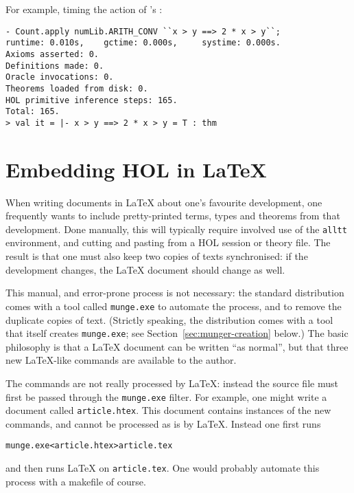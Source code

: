 For example, timing the action of 's :

\setcounter{sessioncount}{1}
\begin{session}
\begin{verbatim}
- Count.apply numLib.ARITH_CONV ``x > y ==> 2 * x > y``;
runtime: 0.010s,    gctime: 0.000s,     systime: 0.000s.
Axioms asserted: 0.
Definitions made: 0.
Oracle invocations: 0.
Theorems loaded from disk: 0.
HOL primitive inference steps: 165.
Total: 165.
> val it = |- x > y ==> 2 * x > y = T : thm
\end{verbatim}
\end{session}



\section{Embedding HOL in \LaTeX{}}

%
When writing documents in \LaTeX{} about one's favourite \HOL{} development, one frequently wants to include pretty-printed terms, types and theorems from that development.
%
Done manually, this will typically require involved use of the \texttt{alltt} environment, and cutting and pasting from a HOL session or theory file.
%
The result is that one must also keep two copies of \HOL{} texts synchronised: if the \HOL{} development changes, the \LaTeX{} document should change as well.

\newcommand{\munge}{\texttt{munge.exe}}
%
This manual, and error-prone process is not necessary: the standard \HOL{} distribution comes with a tool called \munge{} to automate the process, and to remove the duplicate copies of \HOL{} text.
%
(Strictly speaking, the distribution comes with a tool that itself creates \munge{}; see Section~\ref{sec:munger-creation} below.)
%
The basic philosophy is that a \LaTeX{} document can be written ``as normal'', but that three new \LaTeX{}-like commands are available to the author.

The commands are not really processed by \LaTeX{}: instead the source file must first be passed through the \munge{} filter.
%
For example, one might write a document called \texttt{article.htex}.
%
This document contains instances of the new commands, and cannot be processed as is by \LaTeX{}.
%
Instead one first runs
\begin{alltt}
   \munge < article.htex > article.tex
\end{alltt}
and then runs \LaTeX{} on \texttt{article.tex}.
%
One would probably automate this process with a makefile of course.

